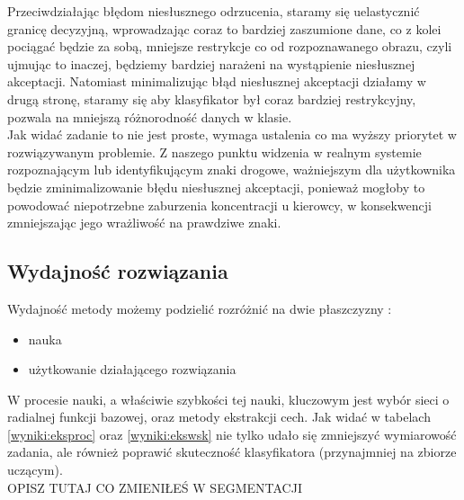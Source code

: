 \documentclass{classrep}
\begin{document}
Przeciwdziałając błędom niesłusznego odrzucenia, staramy się uelastycznić granicę decyzyjną, wprowadzając coraz to bardziej zaszumione dane, co z kolei pociągać będzie za sobą, mniejsze restrykcje co od rozpoznawanego obrazu, czyli ujmując to inaczej, będziemy bardziej narażeni na wystąpienie niesłusznej akceptacji. Natomiast minimalizując błąd niesłusznej akceptacji działamy w drugą stronę, staramy się aby klasyfikator był coraz bardziej restrykcyjny, pozwala na mniejszą różnorodność danych w klasie.\\

Jak widać zadanie to nie jest proste, wymaga ustalenia co ma wyższy priorytet w rozwiązywanym problemie. Z naszego punktu widzenia w realnym systemie rozpoznającym lub identyfikującym znaki drogowe, ważniejszym dla użytkownika będzie zminimalizowanie błędu niesłusznej akceptacji, ponieważ mogłoby to powodować niepotrzebne zaburzenia koncentracji u kierowcy, w konsekwencji zmniejszając jego wrażliwość na prawdziwe znaki.

\subsection{Wydajność rozwiązania}

Wydajność metody możemy podzielić rozróżnić na dwie płaszczyzny :
\begin{itemize}
\item nauka
\item użytkowanie działającego rozwiązania
\end{itemize}


W procesie nauki, a właściwie szybkości tej nauki, kluczowym jest wybór sieci o  radialnej funkcji bazowej, oraz metody ekstrakcji cech. Jak widać w tabelach \ref{wyniki:eksproc} oraz \ref{wyniki:ekswsk} nie tylko udało się zmniejszyć wymiarowość zadania, ale również poprawić skuteczność klasyfikatora (przynajmniej na zbiorze uczącym).\\


{\Large{OPISZ TUTAJ CO ZMIENIŁEŚ W SEGMENTACJI}}



%


\end{document}
